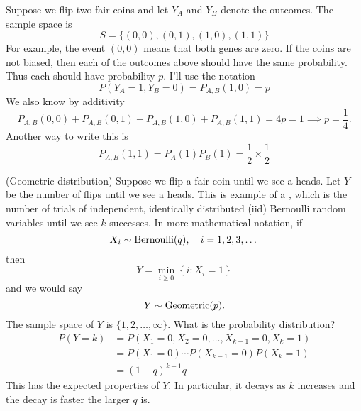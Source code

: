 \begin{itemize}
\begin{example}\label{ex:twocoins} Suppose we flip two fair coins and let $Y_A$ and $Y_B$ denote the outcomes.%
  The sample space is 
\begin{equation*}
S = \{(0,0),(0,1),(1,0),(1,1)\}
\end{equation*}
For example, the event $(0,0)$ means that both genes are zero.  If the coins are not biased, then each of the outcomes above should have the same probability. Thus each should have probability $p$. I'll use the notation 
\begin{equation*}
P(Y_A = 1,Y_B = 0) = P_{A,B}(1,0) = p
\end{equation*}
We also know by additivity 
\begin{equation*}
P_{A,B}(0,0) + P_{A,B}(0,1)+ P_{A,B}(1,0) + P_{A,B}(1,1) = 4p = 1 \implies p = \frac{1}{4}. 
\end{equation*}
Another way to write this is 
\begin{equation*}
P_{A,B}(1,1) = P_A(1)P_B(1)  = \frac{1}{2} \times \frac{1}{2}
\end{equation*}
\end{example}




\begin{example}(Geometric distribution)
Suppose we flip a fair coin until we see a heads. Let $Y$ be the number of flips until we see a heads. This is example of a  , which is the number of trials of independent, identically distributed (iid) Bernoulli random variables until we see $k$ successes. In more mathematical notation, if
\begin{equation*}
X_i \sim {\rm Bernoulli}(q), \quad i = 1,2,3,\dots
\end{equation*}
then 
\begin{equation*}
Y = \min_{i\ge0}\left\{i:X_i=1 \right\}
\end{equation*} 
and we would say 
\begin{equation*}
Y \sim {\rm Geometric}(p).
\end{equation*}
The sample space of $Y$ is $\{1,2,\dots,\infty\}$. What is the probability distribution? 
\begin{align*}
P(Y=k) &= P(X_1=0,X_2=0,\dots,X_{k-1}=0,X_k=1) \\
&= P(X_1 = 0) \cdots  P(X_{k-1}=0)P(X_k=1) \\
&= (1-q)^{k-1}q
\end{align*}
This has the expected properties of $Y$. In particular, it decays as $k$ increases and the decay is faster the larger $q$ is. 


\end{example}
\end{itemize}
